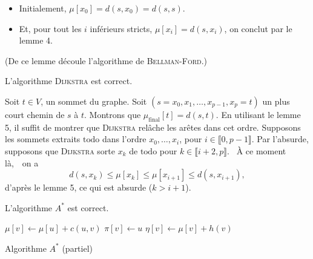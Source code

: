 \documentclass[a4paper]{article}
\begin{document}
	\begin{prv}
		\begin{itemize}
			\item Initialement, $\mu[x_0] = d(s, x_0) = d(s,s)$.
			\item Et, pour tout les $i$ inférieurs stricts, $\mu[x_i] = d(s, x_i)$, on conclut par le lemme 4.
		\end{itemize}
	\end{prv}

	(De ce lemme découle l'algorithme de \textsc{Bellman-Ford}.)

	\begin{crlr}
		L'algorithme \textsc{Dijkstra} est correct.
	\end{crlr}

	\begin{prv}
		Soit $t \in V$, un sommet du graphe. Soit $(s = x_0, x_1, \ldots, x_{p-1}, x_p = t)$ un plus court chemin de $s$ à $t$. Montrons que $\mu_{\text{final}}[t] = d(s, t)$.
		En utilisant le lemme 5, il suffit de montrer que \textsc{Dijkstra} relâche les arêtes dans cet ordre.
		Supposons les sommets extraits $\mathrm{todo}$ dans l'ordre $x_0, \ldots, x_i$, pour $i \in \llbracket 0,p-1 \rrbracket$.
		Par l'absurde, supposons que \textsc{Dijkstra} sorte $x_k$ de $\mathrm{todo}$ pour $k \in \llbracket i+2, p \rrbracket$.
		\guillemotleft~À ce moment là,~\guillemotright\ on a \[
			d(s, x_k) \le \mu[x_k] \le \mu[x_{i+1}] \le d(s, x_{i+1}),
		\]d'après le lemme 5, ce qui est absurde ($k > i + 1$).
	\end{prv}

	\begin{crlr}
		L'algorithme $A^*$ est correct.
	\end{crlr}

	\begin{algorithm}[H]
		\centering
		\begin{algorithmic}[1]
			\State $\mu[v] \gets \mu[u] + c(u,v)$
			\State $\pi[v] \gets u$
			\State $\eta[v] \gets \mu[v] + h(v)$
			\EndIf
			\EndProcedure
		\end{algorithmic}
		\caption{Algorithme $A^*$ (partiel)}
	\end{algorithm}
\end{document}
